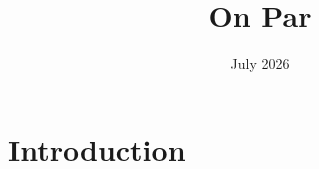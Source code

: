 \documentclass{article}
\title{On Par}
\author{}
\date{July 2026}
\begin{document}
\maketitle

\section{Introduction}
\end{document}
